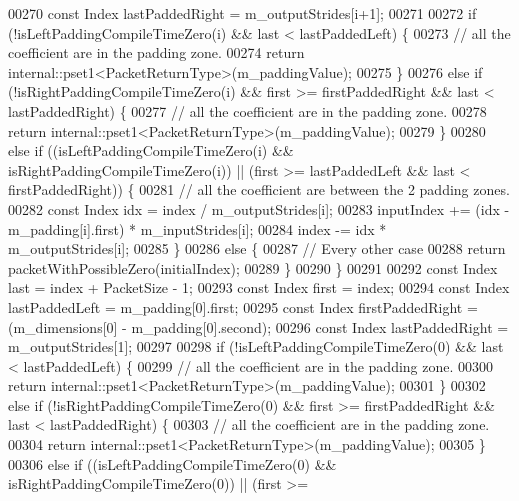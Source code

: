 \begin{DoxyCode}
00270       \textcolor{keyword}{const} Index lastPaddedRight = m\_outputStrides[i+1];
00271 
00272       \textcolor{keywordflow}{if} (!isLeftPaddingCompileTimeZero(i) && last < lastPaddedLeft) \{
00273         \textcolor{comment}{// all the coefficient are in the padding zone.}
00274         \textcolor{keywordflow}{return} internal::pset1<PacketReturnType>(m\_paddingValue);
00275       \}
00276       \textcolor{keywordflow}{else} \textcolor{keywordflow}{if} (!isRightPaddingCompileTimeZero(i) && first >= firstPaddedRight && last < lastPaddedRight) \{
00277         \textcolor{comment}{// all the coefficient are in the padding zone.}
00278         \textcolor{keywordflow}{return} internal::pset1<PacketReturnType>(m\_paddingValue);
00279       \}
00280       \textcolor{keywordflow}{else} \textcolor{keywordflow}{if} ((isLeftPaddingCompileTimeZero(i) && isRightPaddingCompileTimeZero(i)) || (first >= 
      lastPaddedLeft && last < firstPaddedRight)) \{
00281         \textcolor{comment}{// all the coefficient are between the 2 padding zones.}
00282         \textcolor{keyword}{const} Index idx = index / m\_outputStrides[i];
00283         inputIndex += (idx - m\_padding[i].first) * m\_inputStrides[i];
00284         index -= idx * m\_outputStrides[i];
00285       \}
00286       \textcolor{keywordflow}{else} \{
00287         \textcolor{comment}{// Every other case}
00288         \textcolor{keywordflow}{return} packetWithPossibleZero(initialIndex);
00289       \}
00290     \}
00291 
00292     \textcolor{keyword}{const} Index last = index + PacketSize - 1;
00293     \textcolor{keyword}{const} Index first = index;
00294     \textcolor{keyword}{const} Index lastPaddedLeft = m\_padding[0].first;
00295     \textcolor{keyword}{const} Index firstPaddedRight = (m\_dimensions[0] - m\_padding[0].second);
00296     \textcolor{keyword}{const} Index lastPaddedRight = m\_outputStrides[1];
00297 
00298     \textcolor{keywordflow}{if} (!isLeftPaddingCompileTimeZero(0) && last < lastPaddedLeft) \{
00299       \textcolor{comment}{// all the coefficient are in the padding zone.}
00300       \textcolor{keywordflow}{return} internal::pset1<PacketReturnType>(m\_paddingValue);
00301     \}
00302     \textcolor{keywordflow}{else} \textcolor{keywordflow}{if} (!isRightPaddingCompileTimeZero(0) && first >= firstPaddedRight && last < lastPaddedRight) \{
00303       \textcolor{comment}{// all the coefficient are in the padding zone.}
00304       \textcolor{keywordflow}{return} internal::pset1<PacketReturnType>(m\_paddingValue);
00305     \}
00306     \textcolor{keywordflow}{else} \textcolor{keywordflow}{if} ((isLeftPaddingCompileTimeZero(0) && isRightPaddingCompileTimeZero(0)) || (first >= 

\end{DoxyCode}
